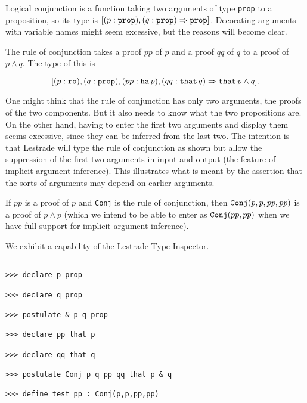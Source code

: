 \documentclass[12pt]{article}
\begin{document}
Logical conjunction is a function taking two arguments of type {\tt prop} to a proposition, so its type is $[(p:{\tt prop}),(q:{\tt prop}) \Rightarrow {\tt prop}]$.  Decorating arguments with variable names might seem excessive, but the reasons will become clear.

The rule of conjunction takes a proof $pp$ of $p$ and a proof $qq$ of $q$ to a proof of $p \wedge q$.    The type of this is 

$$[(p:\verb prop ),(q:{\tt prop}),(pp: \verb that   \, p),(qq:{\tt that}\, q) \Rightarrow {\tt that}\, p \wedge q].$$

One might think that the rule of conjunction has only two arguments, the proofs of the two components.  But it also needs to know what the two propositions are.  On the other hand, having to enter the first two arguments and display them seems excessive, since they can be inferred from the last two.  The intention is that Lestrade will type the rule of conjunction as shown but allow the suppression of the first two arguments in input and output (the feature of implicit argument inference).  This illustrates what is meant by the assertion that the
sorts of arguments may depend on earlier arguments.

If $pp$ is a proof of $p$ and {\tt Conj} is the rule of conjunction, then ${\tt Conj}(p,p,pp,pp)$ is a proof of $p \wedge p$ (which we intend to be able to enter as ${\tt Conj}(pp,pp)$ when we have full support for implicit argument inference).

We exhibit a capability of the Lestrade Type Inspector.

\begin{verbatim}

>>> declare p prop

>>> declare q prop

>>> postulate & p q prop

>>> declare pp that p

>>> declare qq that q

>>> postulate Conj p q pp qq that p & q

>>> define test pp : Conj(p,p,pp,pp)

\end{verbatim}
\end{document}
